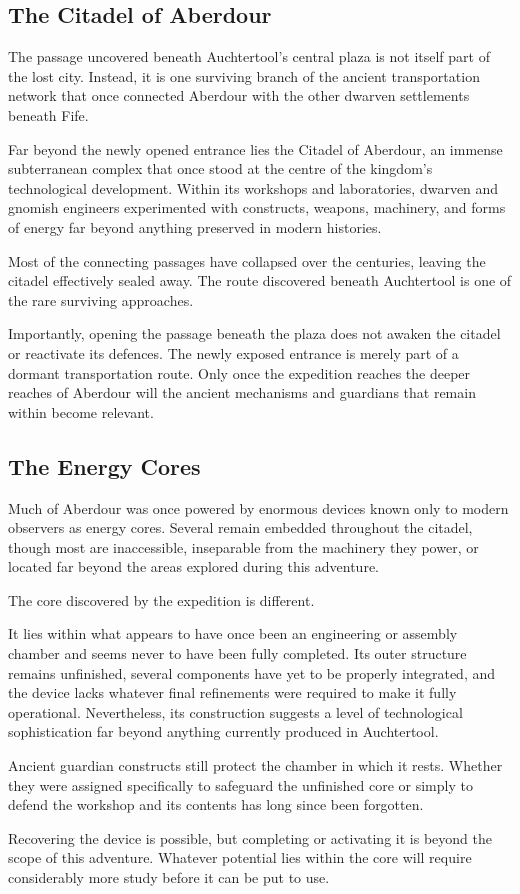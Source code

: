 \subsection*{The Citadel of Aberdour}
{\entryfont The passage uncovered beneath Auchtertool's central plaza is not itself part of the lost city. Instead, it is one surviving branch of the ancient transportation network that once connected Aberdour with the other dwarven settlements beneath Fife.

Far beyond the newly opened entrance lies the Citadel of Aberdour, an immense subterranean complex that once stood at the centre of the kingdom's technological development. Within its workshops and laboratories, dwarven and gnomish engineers experimented with constructs, weapons, machinery, and forms of energy far beyond anything preserved in modern histories.

Most of the connecting passages have collapsed over the centuries, leaving the citadel effectively sealed away. The route discovered beneath Auchtertool is one of the rare surviving approaches.

Importantly, opening the passage beneath the plaza does not awaken the citadel or reactivate its defences. The newly exposed entrance is merely part of a dormant transportation route. Only once the expedition reaches the deeper reaches of Aberdour will the ancient mechanisms and guardians that remain within become relevant.}

\subsection*{The Energy Cores}
{\entryfont Much of Aberdour was once powered by enormous devices known only to modern observers as energy cores. Several remain embedded throughout the citadel, though most are inaccessible, inseparable from the machinery they power, or located far beyond the areas explored during this adventure.

The core discovered by the expedition is different.

It lies within what appears to have once been an engineering or assembly chamber and seems never to have been fully completed. Its outer structure remains unfinished, several components have yet to be properly integrated, and the device lacks whatever final refinements were required to make it fully operational. Nevertheless, its construction suggests a level of technological sophistication far beyond anything currently produced in Auchtertool.

Ancient guardian constructs still protect the chamber in which it rests. Whether they were assigned specifically to safeguard the unfinished core or simply to defend the workshop and its contents has long since been forgotten.

Recovering the device is possible, but completing or activating it is beyond the scope of this adventure. Whatever potential lies within the core will require considerably more study before it can be put to use.}


